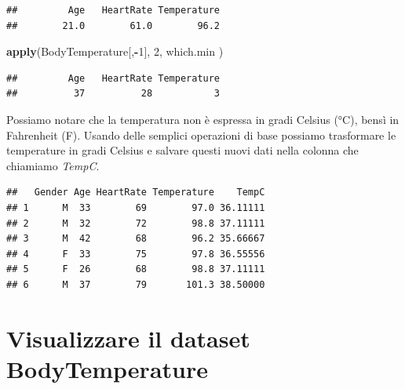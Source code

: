 \documentclass[]{book}
\newenvironment{Shaded}{\begin{snugshade}}{\end{snugshade}}
\newcommand{\ControlFlowTok}[1]{\textcolor[rgb]{0.13,0.29,0.53}{\textbf{#1}}}
\newcommand{\DecValTok}[1]{\textcolor[rgb]{0.00,0.00,0.81}{#1}}
\newcommand{\KeywordTok}[1]{\textcolor[rgb]{0.13,0.29,0.53}{\textbf{#1}}}
\newcommand{\NormalTok}[1]{#1}
\newcommand{\OperatorTok}[1]{\textcolor[rgb]{0.81,0.36,0.00}{\textbf{#1}}}
\newcommand{\StringTok}[1]{\textcolor[rgb]{0.31,0.60,0.02}{#1}}
\begin{document}
\begin{verbatim}
##         Age   HeartRate Temperature 
##        21.0        61.0        96.2
\end{verbatim}

\begin{Shaded}
\begin{Highlighting}[]
\KeywordTok{apply}\NormalTok{(BodyTemperature[,}\OperatorTok{-}\DecValTok{1}\NormalTok{], }\DecValTok{2}\NormalTok{, which.min )}
\end{Highlighting}
\end{Shaded}

\begin{verbatim}
##         Age   HeartRate Temperature 
##          37          28           3
\end{verbatim}

Possiamo notare che la temperatura non è espressa in gradi Celsius (°C), bensì in Fahrenheit (F). Usando delle semplici operazioni di base possiamo trasformare le temperature in gradi Celsius e salvare questi nuovi dati nella colonna che chiamiamo \emph{TempC}.

\begin{Shaded}
\end{Shaded}

\begin{verbatim}
##   Gender Age HeartRate Temperature    TempC
## 1      M  33        69        97.0 36.11111
## 2      M  32        72        98.8 37.11111
## 3      M  42        68        96.2 35.66667
## 4      F  33        75        97.8 36.55556
## 5      F  26        68        98.8 37.11111
## 6      M  37        79       101.3 38.50000
\end{verbatim}

\hypertarget{visualizzare-il-dataset-bodytemperature}{%
\section{Visualizzare il dataset BodyTemperature}\label{visualizzare-il-dataset-bodytemperature}}
\end{document}
